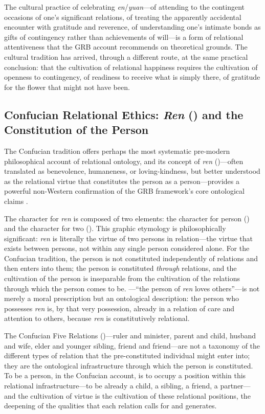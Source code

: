 The cultural practice of celebrating \emph{en}/\emph{yuan}---of attending to the contingent occasions of one's significant relations, of treating the apparently accidental encounter with gratitude and reverence, of understanding one's intimate bonds as gifts of contingency rather than achievements of will---is a form of relational attentiveness that the GRB account recommends on theoretical grounds. The cultural tradition has arrived, through a different route, at the same practical conclusion: that the cultivation of relational happiness requires the cultivation of openness to contingency, of readiness to receive what is simply there, of gratitude for the flower that might not have been.

\subsection{Confucian Relational Ethics: \emph{Ren} () and the Constitution of the Person}
\label{p14:subsec:confucian}

\noindent
The Confucian tradition offers perhaps the most systematic pre-modern philosophical account of relational ontology, and its concept of \emph{ren} ()---often translated as benevolence, humaneness, or loving-kindness, but better understood as the relational virtue that constitutes the person as a person---provides a powerful non-Western confirmation of the GRB framework's core ontological claims \parencite{confucius1998,tu1985}.

The character for \emph{ren} is composed of two elements: the character for person () and the character for two (). This graphic etymology is philosophically significant: \emph{ren} is literally the virtue of two persons in relation---the virtue that exists between persons, not within any single person considered alone. For the Confucian tradition, the person is not constituted independently of relations and then enters into them; the person is constituted \emph{through} relations, and the cultivation of the person is inseparable from the cultivation of the relations through which the person comes to be. ---``the person of \emph{ren} loves others''---is not merely a moral prescription but an ontological description: the person who possesses \emph{ren} is, by that very possession, already in a relation of care and attention to others, because \emph{ren} is constitutively relational.

The Confucian Five Relations ()---ruler and minister, parent and child, husband and wife, elder and younger sibling, friend and friend---are not a taxonomy of the different types of relation that the pre-constituted individual might enter into; they are the ontological infrastructure through which the person is constituted. To be a person, in the Confucian account, is to occupy a position within this relational infrastructure---to be already a child, a sibling, a friend, a partner---and the cultivation of virtue is the cultivation of these relational positions, the deepening of the qualities that each relation calls for and generates.

